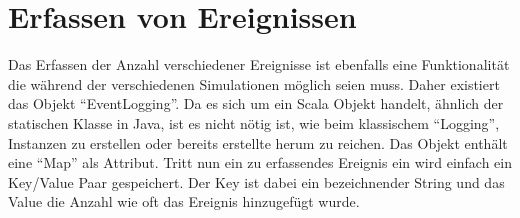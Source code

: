 \documentclass[a4paper,11pt,oneside,%
headsepline,												%
footsepline,												%
bibtotocnumbered									%
]{scrreprt}
\begin{document}
\section{Erfassen von Ereignissen}
Das Erfassen der Anzahl verschiedener Ereignisse ist ebenfalls eine Funktionalität die während der verschiedenen Simulationen möglich seien muss. Daher existiert das Objekt \enquote{EventLogging}. Da es sich um ein Scala Objekt handelt, ähnlich der statischen Klasse in Java, ist es nicht nötig ist, wie beim klassischem \enquote{Logging}, Instanzen zu erstellen oder bereits erstellte herum zu reichen. Das Objekt enthält eine \enquote{Map} als Attribut. Tritt nun ein zu erfassendes Ereignis ein wird einfach ein Key/Value Paar gespeichert. Der Key ist dabei ein bezeichnender String und das Value die Anzahl wie oft das Ereignis hinzugefügt wurde.
\end{document}
